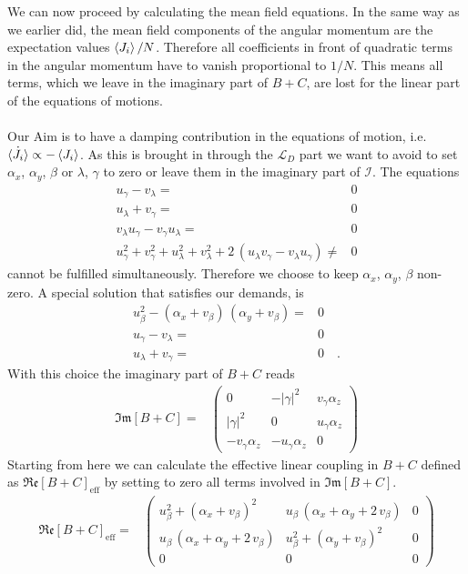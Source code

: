 \documentclass{article}
\begin{document}
We can now proceed by calculating the mean field equations. In the same way as we earlier did, the mean field components of the angular momentum are the expectation values $\braket{J_i}/N$. Therefore all coefficients in front of quadratic terms in the angular momentum have to vanish proportional to $1/N$. This means all terms, which we leave in the imaginary part of $B+C$, are lost for the linear part of the equations of motions.\\\\
Our Aim is to have a damping contribution in the equations of motion, i.e. $\dot{\braket{J_i}}\propto-\braket{J_i}$. As this is brought in through the $\mathcal{L}_D$ part we want to avoid to set $\alpha_x$, $\alpha_y$, $\beta$ or $\lambda$, $\gamma$ to zero or leave them in the imaginary part of $\mathcal{I}$. The equations
\begin{align*}
    u_\gamma-v_\lambda =&0\\
    u_\lambda+ v_\gamma=&0\\
    v_\lambda u_\gamma-v_\gamma u_\lambda=&0\\
    u_\gamma^2+v_\gamma^2+u_\lambda^2+v_\lambda^2+ 2\, (u_\lambda v_\gamma-v_\lambda u_\gamma) \neq&0
\end{align*}
cannot be fulfilled simultaneously. Therefore we choose to keep $\alpha_x$, $\alpha_y$, $\beta$ non-zero. A special solution that satisfies our demands, is
\begin{align*}
    u_\beta^2-(\alpha_x+v_\beta)\,(\alpha_y+v_\beta)=&0\\
    u_\gamma-v_\lambda =&0\\
    u_\lambda+ v_\gamma=&0    \quad.
\end{align*}
With this choice the imaginary part of $B+C$ reads
\begin{align*}
     \mathfrak{Im}[B+C] =& \left( \begin{array}{ccc}
         0& -|\gamma|^2& v_\gamma\alpha_z\\
         |\gamma|^2& 0& u_\gamma\alpha_z\\
        -v_\gamma\alpha_z& -u_\gamma\alpha_z& 0
    \end{array} \right)
\end{align*}
Starting from here we can calculate the effective linear coupling in $B+C$ defined as $\mathfrak{Re}[B+C]_\text{eff}$ by setting to zero all terms involved in $\mathfrak{Im}[B+C]$.
\begin{align*}
    \mathfrak{Re}[B+C]_\text{eff}=&\left( \begin{array}{ccc}
         u_\beta^2+(\alpha_x+v_\beta)^2& u_\beta\,(\alpha_x+\alpha_y+2\,v_\beta)&0\\
          u_\beta\,(\alpha_x+\alpha_y+2\,v_\beta)& u_\beta^2+(\alpha_y+v_\beta)^2 &0\\
       0&0& 0
    \end{array} \right)
\end{align*}
\end{document}
